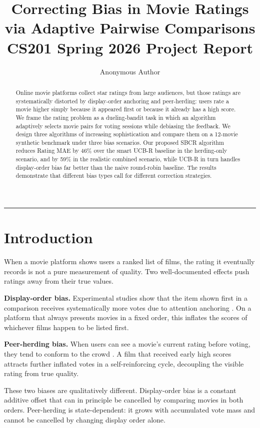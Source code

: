 \documentclass[12pt,a4paper]{article}
\title{\textbf{Correcting Bias in Movie Ratings\\via Adaptive Pairwise Comparisons}\\[0.5em]
\large CS201 Spring 2026 Project Report}
\author{Anonymous Author}
\date{}
\begin{document}
\maketitle

\begin{abstract}
Online movie platforms collect star ratings from large audiences, but those
ratings are systematically distorted by display-order anchoring and peer-herding:
users rate a movie higher simply because it appeared first or because it already
has a high score.  We frame the rating problem as a dueling-bandit task in which
an algorithm adaptively selects movie pairs for voting sessions while debiasing
the feedback.  We design three algorithms of increasing sophistication and compare
them on a 12-movie synthetic benchmark under three bias scenarios.  Our proposed
SBCR algorithm reduces Rating MAE by 46\% over the smart UCB-R baseline in the
herding-only scenario, and by 59\% in the realistic combined scenario, while
UCB-R in turn handles display-order bias far better than the naive round-robin
baseline.  The results demonstrate that different bias types call for different
correction strategies.
\end{abstract}

\tableofcontents
\bigskip\hrule\bigskip

\section{Introduction}

When a movie platform shows users a ranked list of films, the rating it eventually
records is not a pure measurement of quality.  Two well-documented effects push
ratings away from their true values.

\textbf{Display-order bias.}  Experimental studies show that the item shown first
in a comparison receives systematically more votes due to attention anchoring
\cite{joachims2005accurately}.  On a platform that always presents movies in a
fixed order, this inflates the scores of whichever films happen to be listed first.

\textbf{Peer-herding bias.}  When users can see a movie's current rating before
voting, they tend to conform to the crowd \cite{salganik2006experimental}.  A film
that received early high scores attracts further inflated votes in a
self-reinforcing cycle, decoupling the visible rating from true quality.

These two biases are qualitatively different.  Display-order bias is a constant
additive offset that can in principle be cancelled by comparing movies in both
orders.  Peer-herding is state-dependent: it grows with accumulated vote mass and
cannot be cancelled by changing display order alone.
\end{document}
